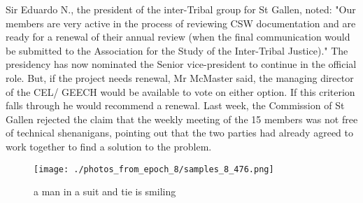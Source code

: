 \documentclass{article}%
\begin{document}
Sir Eduardo N., the president of the inter{-}Tribal group for St Gallen, noted: "Our members are very active in the process of reviewing CSW documentation and are ready for a renewal of their annual review (when the final communication would be submitted to the Association for the Study of the Inter{-}Tribal Justice)."\newline%
The presidency has now nominated the Senior vice{-}president to continue in the official role. But, if the project needs renewal, Mr McMaster said, the managing director of the CEL/ GEECH would be available to vote on either option. If this criterion falls through he would recommend a renewal.\newline%
Last week, the Commission of St Gallen rejected the claim that the weekly meeting of the 15 members was not free of technical shenanigans, pointing out that the two parties had already agreed to work together to find a solution to the problem.\newline%

%


\begin{figure}[h!]%
\centering%
\texttt{[image: ./photos\_from\_epoch\_8/samples\_8\_476.png]}%
\caption{a man in a suit and tie is smiling}%
\end{figure}

%
\end{document}
